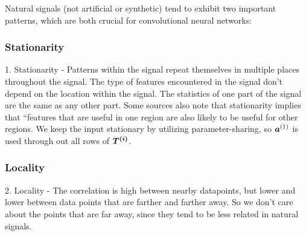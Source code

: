 Natural signals (not artificial or synthetic) tend to exhibit two important patterns, which are both crucial for convolutional neural networks:

\subsubsection{Stationarity}
1. Stationarity - Patterns within the signal repeat themselves in multiple places throughout the signal.
The type of features encountered in the signal don’t depend on the location within the signal. The statistics of one part of the signal are the same as any other part. Some sources also note that stationarity implies that “features that are useful in one region are also likely to be useful for other regions. We keep the input stationary by utilizing parameter-sharing, so $\vect{a}^{(1)}$ is used through out all rows of $\matr{T^{(i)}}$.

\subsubsection{Locality}
2. Locality - The correlation is high between nearby datapoints, but lower and lower between data points that are farther and farther away.
So we don't care about the points that are far away, since they tend to be less related in natural signals.


